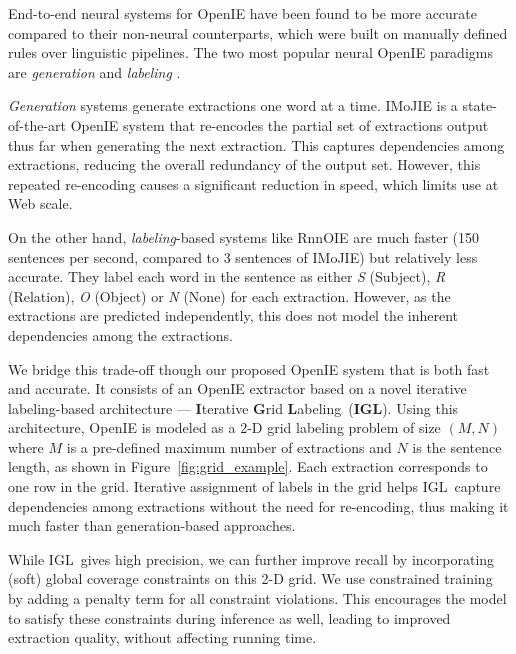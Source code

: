 \documentclass[11pt,a4paper]{article}
\newcommand{\shortname}{{\scshape IGL}}
\newcommand{\boldlongname}{\textbf{I}terative \textbf{G}rid \textbf{L}abeling}
\newcommand{\boldshortname}{{\textbf{IGL}}}
\begin{document}
End-to-end neural systems for OpenIE have been found to be more accurate compared to their non-neural counterparts, which were built on manually defined rules over linguistic pipelines. The two most popular neural OpenIE paradigms are \emph{generation} \citep{cui+18, kolluru&al20} and \emph{labeling} \citep{stanovsky&al18, roy&al19}. 


\emph{Generation} systems generate extractions one word at a time. IMoJIE \cite{kolluru&al20} is a state-of-the-art OpenIE system that re-encodes the partial set of extractions output thus far when generating the next extraction. This captures dependencies among extractions, reducing the overall redundancy of the output set. However, this repeated re-encoding causes a significant reduction in speed, which limits use at Web scale.



On the other hand, \emph{labeling}-based systems like RnnOIE \cite{stanovsky&al15} are much faster (150 sentences per second, compared to 3 sentences of IMoJIE) but relatively less accurate. They label each word in the sentence as either \textit{S} (Subject), \textit{R} (Relation), \textit{O} (Object) or \textit{N} (None) for each extraction. However, as the extractions are predicted independently, this does not model the inherent dependencies among the extractions.

We bridge this trade-off though our proposed OpenIE system that is both fast and accurate. It consists of an OpenIE extractor based on a novel iterative labeling-based architecture --- \boldlongname\ (\boldshortname). Using this architecture, OpenIE is modeled as a 2-D 
grid labeling problem of size $(M, N)$ where $M$ is a pre-defined maximum number of extractions and $N$ is the sentence length, as shown in Figure~\ref{fig:grid_example}.
Each extraction corresponds to one row in the grid. Iterative assignment of labels in the grid helps \shortname\ capture dependencies among extractions without the need for re-encoding, thus making it much faster than generation-based approaches.


While \shortname\ gives high precision, we can further improve recall by incorporating (soft) global coverage constraints on this 2-D grid. We use constrained training \cite{mehta&al18} by adding a penalty term for all constraint violations. This encourages the model to satisfy these constraints during inference as well, leading to improved extraction quality, without affecting running time.
\end{document}
